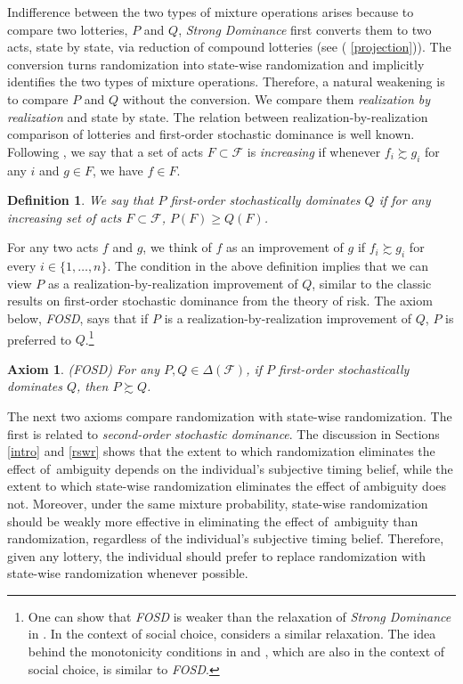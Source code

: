 \documentclass[12pt, notitlepage]{article}
\newtheorem{axiom}{Axiom}
\newtheorem{definition}{Definition}
\begin{document}
Indifference between the two types of mixture operations arises because to
compare two lotteries, $P$ and $Q$, \textit{Strong Dominance} first converts
them to two acts, state by state, via reduction of compound lotteries (see (%
\ref{projection})). The conversion turns randomization into state-wise
randomization and implicitly identifies the two types of mixture operations.
Therefore, a natural weakening is to compare $P$ and $Q$ without the
conversion. We compare them \textit{realization by realization} and state by
state. The relation between realization-by-realization comparison of
lotteries and first-order stochastic dominance is well known. Following \cite%
{Lehmann55}, we say that a set of acts $F\subset \mathcal{F}$ is \textit{%
increasing} if whenever $f_{i}\succsim g_{i}$ for any $i$ and $g\in F$, we
have $f\in F$.

\begin{definition}
We say that $P$ \textit{first-order stochastically dominates} $Q$ if for any
increasing set of acts $F\subset \mathcal{F}$, $P(F)\geq Q(F)$.
\end{definition}

For any two acts $f$ and $g$, we think of $f$ as an improvement of $g$ if $%
f_{i}\succsim g_{i}$ for every $i\in \{1,\dots ,n\}$. The condition in the
above definition implies that we can view $P$ as a
realization-by-realization improvement of $Q$, similar to the classic
results on first-order stochastic dominance from the theory of risk. The
axiom below, \textit{FOSD}, says that if $P$ is a realization-by-realization
improvement of $Q$, $P$ is preferred to $Q$.\footnote{%
One can show that \textit{FOSD} is weaker than the relaxation of \textit{%
Strong Dominance} in \cite{Saito11}. In the context of social choice, \cite%
{Saito13} considers a similar relaxation. The idea behind the monotonicity
conditions in \cite{GajdosMaurin04} and \cite{Fleurbaey10}, which are also
in the context of social choice, is similar to \textit{FOSD}.}

\begin{axiom}
(FOSD) For any $P,Q\in \Delta (\mathcal{F})$, if $P$ first-order
stochastically dominates $Q$, then $P\succsim Q$.
\end{axiom}

The next two axioms compare randomization with state-wise randomization. The
first is related to \textit{second-order stochastic dominance}. The
discussion in Sections \ref{intro} and \ref{rswr} shows that the extent to
which randomization eliminates the effect of\ ambiguity depends on the
individual's subjective timing belief, while the extent to which state-wise
randomization eliminates the effect of ambiguity does not. Moreover, under
the same mixture probability, state-wise randomization should be weakly more
effective in eliminating the effect of\ ambiguity than randomization,
regardless of the individual's subjective timing belief. Therefore, given
any lottery, the individual should prefer to replace randomization with
state-wise randomization whenever possible.
\end{document}
